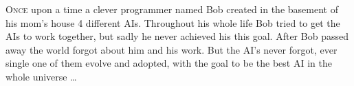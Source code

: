\clearpage
\thispagestyle{empty}
\vspace*{\fill}
\begin{center}
\begin{minipage}{1.0\textwidth}
\textsc{Once} upon a time a clever programmer named Bob created in the basement of his mom's house 4 different AIs. Throughout his whole life Bob tried to get the AIs to work together, but sadly he never achieved his this goal. After Bob passed away the world forgot about him and his work. But the AI's never forgot, ever single one of them evolve and adopted, with the goal to be the best AI in the whole universe \ldots
\end{minipage}
\end{center}
\vfill %
\clearpage
